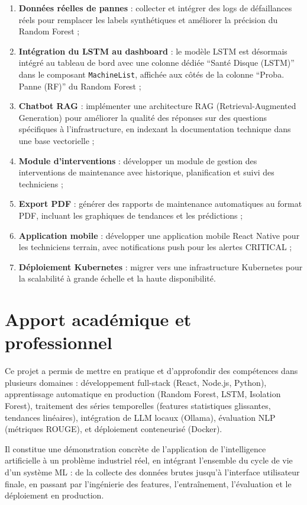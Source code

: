 \begin{enumerate}
  \item \textbf{Données réelles de pannes} : collecter et intégrer des logs de
        défaillances réels pour remplacer les labels synthétiques et améliorer la
        précision du Random Forest ;
  \item \textbf{Intégration du LSTM au dashboard} : le modèle LSTM est désormais
        intégré au tableau de bord avec une colonne dédiée ``Santé Disque (LSTM)''
        dans le composant \texttt{MachineList}, affichée aux côtés de la colonne
        ``Proba. Panne (RF)'' du Random Forest ;
  \item \textbf{Chatbot RAG} : implémenter une architecture RAG
        (Retrieval-Augmented Generation) pour améliorer la qualité des réponses sur
        des questions spécifiques à l'infrastructure, en indexant la documentation
        technique dans une base vectorielle ;
  \item \textbf{Module d'interventions} : développer un module de gestion des
        interventions de maintenance avec historique, planification et suivi des
        techniciens ;
  \item \textbf{Export PDF} : générer des rapports de maintenance automatiques au
        format PDF, incluant les graphiques de tendances et les prédictions ;
  \item \textbf{Application mobile} : développer une application mobile React Native
        pour les techniciens terrain, avec notifications push pour les alertes CRITICAL ;
  \item \textbf{Déploiement Kubernetes} : migrer vers une infrastructure Kubernetes
        pour la scalabilité à grande échelle et la haute disponibilité.
\end{enumerate}

\section*{Apport académique et professionnel}

Ce projet a permis de mettre en pratique et d'approfondir des compétences dans plusieurs
domaines : développement full-stack (React, Node.js, Python), apprentissage automatique
en production (Random Forest, LSTM, Isolation Forest), traitement des séries temporelles
(features statistiques glissantes, tendances linéaires), intégration de LLM locaux
(Ollama), évaluation NLP (métriques ROUGE), et déploiement conteneurisé (Docker).

Il constitue une démonstration concrète de l'application de l'intelligence artificielle
à un problème industriel réel, en intégrant l'ensemble du cycle de vie d'un système ML :
de la collecte des données brutes jusqu'à l'interface utilisateur finale, en passant par
l'ingénierie des features, l'entraînement, l'évaluation et le déploiement en production.
